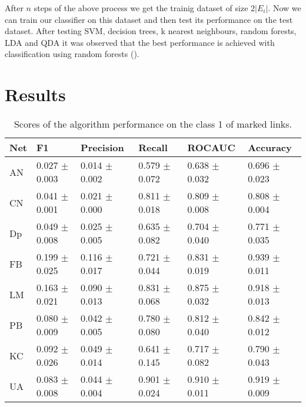 \documentclass{llncs}
\begin{document}
After $n$ steps of the above process we get the trainig dataset of size $2 |E_i|$. Now we can train our classifier on this dataset and then test its performance on the test dataset. After testing SVM, decision trees, k nearest neighbours, random forests, LDA and QDA it was observed that the best performance is achieved with classification using random forests ().
%
\section{Results}
%
\setlength{\tabcolsep}{5pt}
\renewcommand{\arraystretch}{1.5}
\begin{table}
\begin{center}
\caption{Scores of the algorithm performance on the class 1 of marked links.}
\begin{tabular}{| l | l | l | l | l | l |}
\hline
Net & F1 & Precision & Recall & ROCAUC & Accuracy  \\ \hline
AN & 0.027 $\pm$ 0.003 & 0.014 $\pm$ 0.002 & 0.579 $\pm$ 0.072 & 0.638 $\pm$ 0.032 & 0.696 $\pm$ 0.023  \\ \hline
CN & 0.041 $\pm$ 0.001 & 0.021 $\pm$ 0.000 & 0.811 $\pm$ 0.018 & 0.809 $\pm$ 0.008 & 0.808 $\pm$ 0.004  \\ \hline
Dp & 0.049 $\pm$ 0.008 & 0.025 $\pm$ 0.005 & 0.635 $\pm$ 0.082 & 0.704 $\pm$ 0.040 & 0.771 $\pm$ 0.035  \\ \hline
FB & 0.199 $\pm$ 0.025 & 0.116 $\pm$ 0.017 & 0.721 $\pm$ 0.044 & 0.831 $\pm$ 0.019 & 0.939 $\pm$ 0.011  \\ \hline
LM & 0.163 $\pm$ 0.021 & 0.090 $\pm$ 0.013 & 0.831 $\pm$ 0.068 & 0.875 $\pm$ 0.032 & 0.918 $\pm$ 0.013 \\ \hline
PB & 0.080 $\pm$ 0.009 & 0.042 $\pm$ 0.005 & 0.780 $\pm$ 0.080 & 0.812 $\pm$ 0.040 & 0.842 $\pm$ 0.012  \\ \hline
KC & 0.092 $\pm$ 0.026 & 0.049 $\pm$ 0.014 & 0.641 $\pm$ 0.145 & 0.717 $\pm$ 0.082 & 0.790 $\pm$  0.043 \\ \hline
UA & 0.083 $\pm$ 0.008 & 0.044 $\pm$ 0.004 & 0.901 $\pm$ 0.024 & 0.910 $\pm$ 0.011 & 0.919 $\pm$ 0.009  \\ 
\hline
\end{tabular}
\end{center}
\end{table}
%
\end{document}
